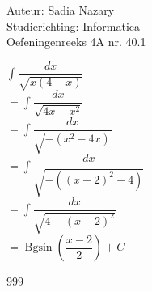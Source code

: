 \documentclass[a4paper]{article}
\newcommand{\dint}{\displaystyle\int}
\newcommand{\Bgsin}{\operatorname{Bgsin}}
\begin{document}
\noindent \large Auteur: Sadia Nazary \\
\noindent \large Studierichting: Informatica \\
\noindent \large Oefeningenreeks 4A nr. 40.1 \\

\medskip

\normalsize

$\dint \dfrac{dx}{\sqrt{x(4-x)}}$ \\

$=\dint \dfrac{dx}{\sqrt{4x-x^2}}$ \\

$=\dint \dfrac{dx}{\sqrt{-(x^2-4x)}}$ \\

$=\dint \dfrac{dx}{\sqrt{-((x-2)^2-4)}}$ \\

$=\dint \dfrac{dx}{\sqrt{4-(x-2)^2}}$ \\

$=\Bgsin\left(\dfrac{x-2}{2}\right) + C$ \\


\begin{thebibliography}{999}
\end{thebibliography}
\end{document}
